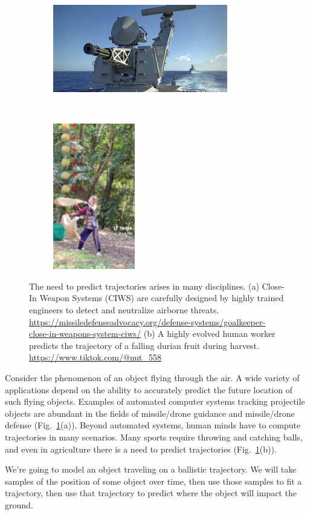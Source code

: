 \begin{figure}[t!]
    \centering
    \begin{subfigure}[t]{0.5\textwidth}
        \centering
        \includegraphics[height=1.5in]{images/CIWS.jpg}
        \caption{}
    \end{subfigure}%
    ~ 
    \begin{subfigure}[t]{0.5\textwidth}
        \centering
        \includegraphics[height=2.5in]{images/Durian.png}
        \caption{}
    \end{subfigure}
    \caption{\label{fig:IntroApplications} The need to predict trajectories arises in many disciplines. (a) Close-In Weapon Systems (CIWS) are carefully designed by highly trained engineers to detect and neutralize airborne threats. \href{https://missiledefenseadvocacy.org/defense-systems/goalkeeper-close-in-weapons-system-ciws/}{https://missiledefenseadvocacy.org/defense-systems/goalkeeper-close-in-weapons-system-ciws/} (b) A highly evolved human worker predicts the trajectory of a falling durian fruit during harvest. \href{https://www.tiktok.com/@nut\_558}{https://www.tiktok.com/@nut\_558}}
\end{figure}

Consider the phenomenon of an object flying through the air. A wide variety of applications depend on the ability to accurately predict the future location of such flying objects. Examples of automated computer systems tracking projectile objects are abundant in the fields of missile/drone guidance and missile/drone defense (Fig.~\ref{fig:IntroApplications}(a)). Beyond automated systems, human minds have to compute trajectories in many scenarios. Many sports require throwing and catching balls, and even in agriculture there is a need to predict trajectories (Fig.~\ref{fig:IntroApplications}(b)).

We're going to model an object traveling on a ballistic trajectory. We will take samples of the position of some object over time, then use those samples to fit a trajectory, then use that trajectory to predict where the object will impact the ground.

